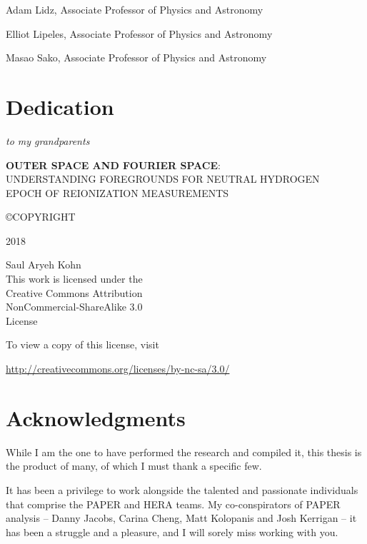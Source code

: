 \documentclass[12pt,twoside,openany]{book}
\makeatletter
\newcommand{\doublespaced}{\renewcommand{\baselinestretch}{2}\normalfont}
\newcommand{\halfspaced}{\renewcommand{\baselinestretch}{1.5}\normalfont}
\newcommand{\unchapter}[1]{%
  \begingroup
  \let\@makechapterhead\@gobble %
  \chapter{#1}
  \endgroup
}
\newcommand{\tita}{{\bf OUTER SPACE AND FOURIER SPACE}:\\UNDERSTANDING FOREGROUNDS FOR NEUTRAL HYDROGEN\\EPOCH OF REIONIZATION MEASUREMENTS}
\makeatother
\begin{document}
\noindent Adam Lidz, Associate Professor of Physics and Astronomy

\noindent Elliot Lipeles, Associate Professor of Physics and Astronomy

\noindent Masao Sako, Associate Professor of Physics and Astronomy

\newpage

\pagestyle{plain}
\unchapter{Dedication}
\doublespaced
\vspace*{2in}
\begin{center}
{\large\emph{to my grandparents}}
\end{center}

\newpage


\thispagestyle{empty} %

\vspace*{\fill}

\begin{flushleft}
{\tita }

\copyright \space COPYRIGHT
 
2018

Saul Aryeh Kohn\\[24 pt] %

This work is licensed under the \\
Creative Commons Attribution \\
NonCommercial-ShareAlike 3.0 \\
License

To view a copy of this license, visit

\url{http://creativecommons.org/licenses/by-nc-sa/3.0/}
\end{flushleft}



\chapter{Acknowledgments}
\halfspaced

While I am the one to have performed the research and compiled it, this thesis is the product of many, of which I must thank a specific few. 

It has been a privilege to work alongside the talented and passionate individuals that comprise the PAPER and HERA teams. My co-conspirators of PAPER analysis -- Danny Jacobs, Carina Cheng, Matt Kolopanis and Josh Kerrigan -- it has been a struggle and a pleasure, and I will sorely miss working with you.
\end{document}
